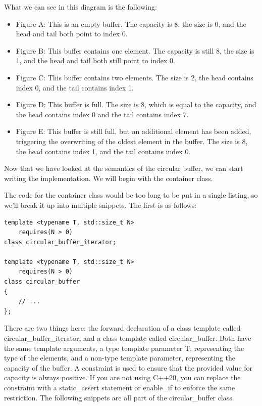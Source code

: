 What we can see in this diagram is the following:

\begin{itemize}
\item
Figure A: This is an empty buffer. The capacity is 8, the size is 0, and the head and tail both point to index 0.

\item
Figure B: This buffer contains one element. The capacity is still 8, the size is 1, and the head and tail both still point to index 0.

\item
Figure C: This buffer contains two elements. The size is 2, the head contains index 0, and the tail contains index 1.

\item
Figure D: This buffer is full. The size is 8, which is equal to the capacity, and the head contains index 0 and the tail contains index 7.

\item
Figure E: This buffer is still full, but an additional element has been added, triggering the overwriting of the oldest element in the buffer. The size is 8, the head contains index 1, and the tail contains index 0.
\end{itemize}

Now that we have looked at the semantics of the circular buffer, we can start writing the implementation. We will begin with the container class.


The code for the container class would be too long to be put in a single listing, so we’ll break it up into multiple snippets. The first is as follows:

\begin{lstlisting}[style=styleCXX]
template <typename T, std::size_t N>
	requires(N > 0)
class circular_buffer_iterator;

template <typename T, std::size_t N>
	requires(N > 0)
class circular_buffer
{
	// ...
};
\end{lstlisting}

There are two things here: the forward declaration of a class template called circular\_buffer\_iterator, and a class template called circular\_buffer. Both have the same template arguments, a type template parameter T, representing the type of the elements, and a non-type template parameter, representing the capacity of the buffer. A constraint is used to ensure that the provided value for capacity is always positive. If you are not using C++20, you can replace the constraint with a static\_assert statement or enable\_if to enforce the same restriction. The following snippets are all part of the circular\_buffer class.

